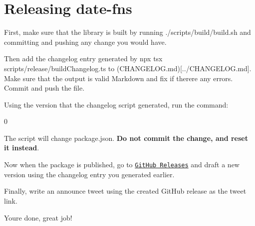 \chapter{Releasing date-\/fns }
\hypertarget{md_frontend_2node__modules_2date-fns_2docs_2release}{}\label{md_frontend_2node__modules_2date-fns_2docs_2release}
\label{md_frontend_2node__modules_2date-fns_2docs_2release_autotoc_md2432}%
%



\begin{DoxyEnumerate}
\item First, make sure that the library is built by running {\ttfamily ./scripts/build/build.sh} and committing and pushing any change you would have.
\item Then add the changelog entry generated by {\ttfamily npx tsx scripts/release/build\+Changelog.\+ts} to (CHANGELOG.\+md)\mbox{[}../\+CHANGELOG.md\mbox{]}. Make sure that the output is valid Markdown and fix if there\textquotesingle{}re any errors. Commit and push the file.
\item Using the version that the changelog script generated, run the command\+:


\begin{DoxyCode}{0}

\end{DoxyCode}


The script will change {\ttfamily package.\+json}. {\bfseries{Do not commit the change, and reset it instead}}.
\item Now when the package is published, go to \href{https://github.com/date-fns/date-fns/releases}{\texttt{Git\+Hub Releases}} and draft a new version using the changelog entry you generated earlier.
\item Finally, write an announce tweet using the created Git\+Hub release as the tweet link.
\end{DoxyEnumerate}

You\textquotesingle{}re done, great job! 